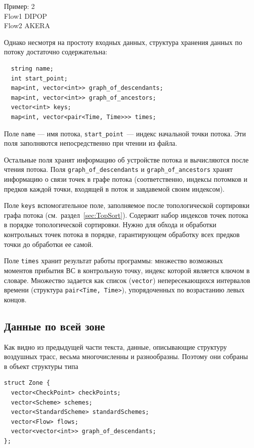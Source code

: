 \documentclass[12pt]{article}
\theoremstyle{plain}
\begin{document}
Пример:
2\\
Flow1 DIPOP\\
Flow2 AKERA

\medskip

Однако несмотря на простоту входных данных, структура хранения данных по потоку достаточно содержательна:
\begin{verbatim}
  string name;
  int start_point;
  map<int, vector<int>> graph_of_descendants;
  map<int, vector<int>> graph_of_ancestors;
  vector<int> keys;
  map<int, vector<pair<Time, Time>>> times;
\end{verbatim}
Поле \texttt{name} --- имя потока, \texttt{start\_point}~--- индекс начальной точки потока. Эти поля заполняются непосредственно при чтении из файла.

Остальные поля хранят информацию об устройстве потока и вычисляются после чтения потока. Поля \texttt{graph\_of\_descendants} и \texttt{graph\_of\_ancestors} хранят информацию о связи точек в графе потока (соответственно, индексы потомков и предков каждой точки, входящей в поток и завдавемой своим индексом). 

Поле \texttt{keys} вспомогательное поле, заполняемое после топологической сортировки графа потока (см.~раздел~\ref{sec:TopSort}). Содержит набор индексов точек потока в порядке топологической сортировки. Нужно для обхода и обработки контрольных точек потока в порядке, гарантирующем обработку всех предков точки до обработки ее самой.

Поле \texttt{times} хранит результат работы программы: множество возможных моментов прибытия ВС в контрольную точку, индекс которой является ключом в словаре. Множество задается как список (\texttt{vector}) непересекающихся интервалов времени (структура \texttt{pair<Time, Time>}), упорядоченных по возрастанию левых концов.


\subsection{Данные по всей зоне}

Как видно из предыдущей части текста, данные, описывающие структуру воздушных трасс, весьма многочисленны и разнообразны. Поэтому они собраны в объект структуры типа
\begin{verbatim}
struct Zone {
  vector<CheckPoint> checkPoints;
  vector<Scheme> schemes;
  vector<StandardScheme> standardSchemes;
  vector<Flow> flows;
  vector<vector<int>> graph_of_descendants;
};
\end{verbatim}
\end{document}

